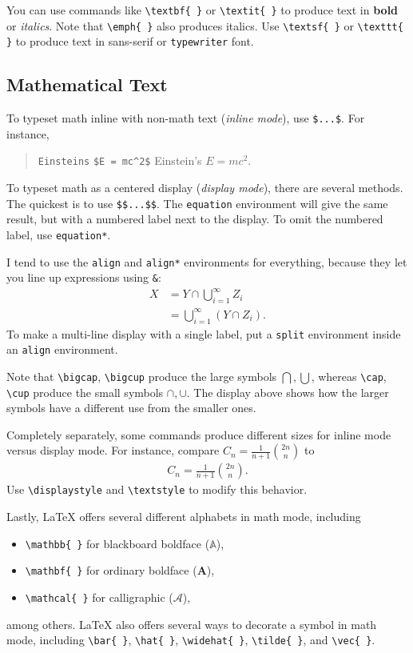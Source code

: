 \documentclass[a4paper,10pt,leqno]{article}
\numberwithin{equation}{section}
\theoremstyle{plain}
\theoremstyle{definition}
\theoremstyle{remark}
\begin{document}
You can use commands like \verb|\textbf{ }| or  \verb|\textit{ }| to produce text in \textbf{bold} or \textit{italics}.
Note that \verb|\emph{ }| also produces italics.
Use \verb|\textsf{ }| or \verb|\texttt{ }| to produce text in \textsf{sans-serif} or \texttt{typewriter} font.

\subsection{Mathematical Text}

To typeset math inline with non-math text (\emph{inline mode}), use \verb|$...$|.
For instance,
\begin{quote}
\texttt{Einstein\textquotesingle{}s} \verb|$E = mc^2$|
\quad
Einstein's $E = mc^2$.
\end{quote}
To typeset math as a centered display (\emph{display mode}), there are several methods.
The quickest is to use \verb|$$...$$|.
The \texttt{equation} environment will give the same result, but with a numbered label next to the display.
To omit the numbered label, use \texttt{equation*}.

I tend to use the \texttt{align} and \texttt{align*} environments for everything, because they let you line up expressions using \verb|&|:
\begin{align}\label{eq:1}
X 
	&= Y \cap \bigcup_{i = 1}^\infty Z_i\\
	&= \bigcup_{i = 1}^\infty {(Y \cap Z_i)}.
\end{align}
To make a multi-line display with a single label, put a \texttt{split} environment inside an \texttt{align} environment.

Note that \verb|\bigcap|, \verb|\bigcup| produce the large symbols $\bigcap, \bigcup$, whereas \verb|\cap|, \verb|\cup| produce the small symbols $\cap, \cup$.
The display above shows how the larger symbols have a different use from the smaller ones.

Completely separately, some commands produce different sizes for inline mode versus display mode.
For instance, compare $C_n = \frac{1}{n + 1} \binom{2n}{n}$ to
\begin{align*}
C_n = \frac{1}{n + 1} \binom{2n}{n}.
\end{align*}
Use \verb|\displaystyle| and \verb|\textstyle| to modify this behavior.

Lastly, \LaTeX{} offers several different alphabets in math mode, including
\begin{itemize} 
\item 	\verb|\mathbb{ }| for blackboard boldface ($\mathbb{A}$),

\item 	\verb|\mathbf{ }| for ordinary boldface ($\mathbf{A}$), 

\item 	\verb|\mathcal{ }| for calligraphic ($\mathcal{A}$),

\end{itemize}
among others.
\LaTeX{} also offers several ways to decorate a symbol in math mode, including \verb|\bar{ }|, \verb|\hat{ }|, \verb|\widehat{ }|, \verb|\tilde{ }|, and \verb|\vec{ }|.
\end{document}
